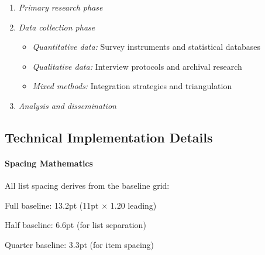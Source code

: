 \documentclass[11pt]{article}
\begin{document}
\begin{enumerate}
\item \emph{Primary research phase}
  
\item \emph{Data collection phase}
  \begin{itemize}
  \item \emph{Quantitative data:} Survey instruments and statistical databases
  \item \emph{Qualitative data:} Interview protocols and archival research
  \item \emph{Mixed methods:} Integration strategies and triangulation
  \end{itemize}
  
\item \emph{Analysis and dissemination}
\end{enumerate}

\subsection{Technical Implementation Details}

\paragraph{Spacing Mathematics} All list spacing derives from the baseline grid:
\begin{compactitem}
\item Full baseline: 13.2pt (11pt × 1.20 leading)
\item Half baseline: 6.6pt (for list separation)
\item Quarter baseline: 3.3pt (for item spacing)
\end{compactitem}
\end{document}
